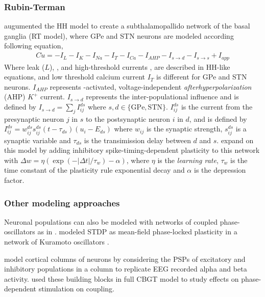 \subsubsection{Rubin-Terman}
\cite{terman2002activity} augumented the HH model to create a subthalamopallido network of the
basal ganglia (RT model), where GPe and STN neurons are modeled according following equation,
\begin{align}
	C \dot u = - I_L - I_K - I_{Na} - I_T - I_{Ca} - I_{AHP} - I_{s \rightarrow d} -
	I_{s \rightarrow s} + I_{app}
\end{align}
Where leak ($L$), \K, \Na and high-threshold \Ca currents \cite{song2000characterization}, are
described in HH-like equations, and low threshold calcium current $I_T$ is different for GPe and
STN neurons. $I_{AHP}$ represents \Ca-activated, voltage-independent \textit{afterhyperpolarization}
(AHP) $K^+$ current. $I_{s \rightarrow d}$ represents the inter-populational influence and is
defined by
$I_{s \rightarrow d} = \sum_{j} I_{ij}^{ds}$ where $s, d \in \{\text{GPe}, \text{STN}\}$.
$I_{ij}^{ds}$ is the current from the presynaptic neuron $j$ in $s$ to the
postsynaptic neuron $i$ in $d$, and is defined by
$I_{ij}^{ds} = w_{ij}^{ds}s_{ij}^{ds}(t - \tau_{ds})(u_i - E_{ds})$ where $w_{ij}$ is the
synaptic strength, $s_{ij}^{ds}$ is a synaptic variable and $\tau_{ds}$ is the transimission
delay between $d$ and $s$.
\cite{madadi2022inhibitory} expand on this model by adding inhibitory spike-timing-dependent
plasticity to this network with $\Delta w = \eta(\exp(-|\Delta t| / \tau_w) - \alpha)$,
where $\eta$ is the \textit{learning rate}, $\tau_w$ is the time constant of the plasticity
rule exponential decay and $\alpha$ is the depression factor.

\subsubsection{Other modeling approaches}
Neuronal populations can also be modeled with networks of coupled phase-oscillators as in
\cite{tass2006long}. \cite{duchet2023mean} modeled STDP as mean-field phase-locked plasticity in a network of
Kuramoto oscillators \cite{kuramoto1984phase}.

\cite{jansen1995electroencephalogram} model cortical columns of neurons by considering the PSPs of
excitatory and inhibitory populations in a column to replicate EEG recorded alpha and beta activity.
\cite{west2022stimulating} used these building blocks in full CBGT model to study effects on
phase-dependent stimulation on coupling.

